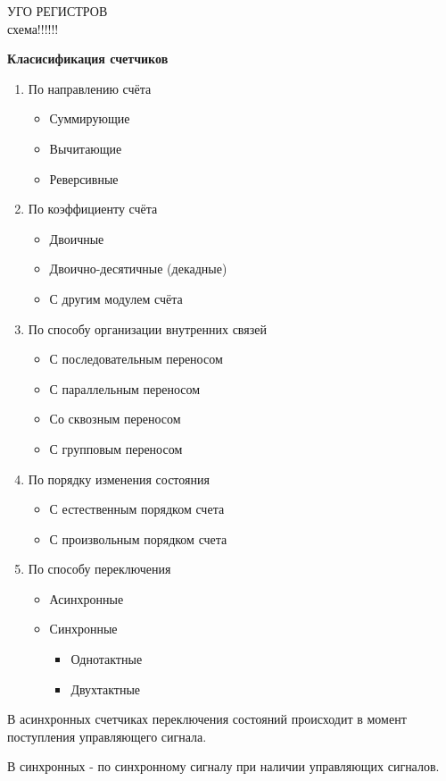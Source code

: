 УГО РЕГИСТРОВ\\


схема!!!!!!


\newpage
\textbf{Класисификация счетчиков}
\begin{enumerate}
  \item По направлению счёта
  \begin{itemize}
    \item Суммирующие
    \item Вычитающие
    \item Реверсивные
  \end{itemize}
  \item По коэффициенту счёта
  \begin{itemize}
    \item Двоичные
    \item Двоично-десятичные (декадные)
    \item С другим модулем счёта
  \end{itemize}
  \item По способу организации внутренних связей
  \begin{itemize}
    \item С последовательным переносом
    \item С параллельным переносом
    \item Со сквозным переносом
    \item С групповым переносом
  \end{itemize}
  \item По порядку изменения состояния
  \begin{itemize}
    \item С естественным порядком счета
    \item С произвольным порядком счета
  \end{itemize}
  \item По способу переключения
  \begin{itemize}
    \item Асинхронные
    \item Синхронные
    \begin{itemize}
      \item Однотактные
      \item Двухтактные
    \end{itemize}
  \end{itemize}
\end{enumerate}

В асинхронных счетчиках переключения состояний происходит
в момент поступления управляющего сигнала.

В синхронных - по синхронному сигналу при наличии управляющих сигналов.
